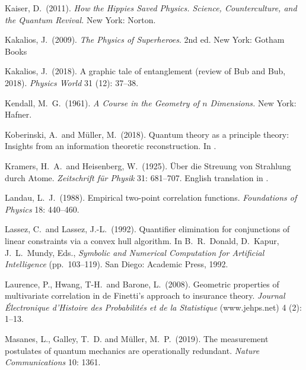 \documentclass[12pt]{article}
\numberwithin{equation}{section}
\begin{document}
\begin{thebibliography}{}
 Kaiser, D.\ (2011). \emph{How the Hippies Saved Physics. Science, Counterculture, and the Quantum Revival.} New York: Norton.

 Kakalios, J.\ (2009). \emph{The Physics of Superheroes}. 2nd ed. New York: Gotham Books

 Kakalios, J.\ (2018). A graphic tale of entanglement (review of Bub and Bub, 2018). \emph{Physics World} 31 (12): 37--38. 

 Kendall, M.~G.\ (1961). \emph{A Course in the Geometry of $n$ Dimensions.} New York: Hafner. 

 Koberinski, A.\ and M\"uller, M.\ (2018). Quantum theory as a principle theory: Insights from an information theoretic reconstruction. In \citet[pp. 257--281]{Cuffaro and Fletcher 2018}. 

 Kramers, H.\ A.\ and Heisenberg, W.\ (1925). \"{U}ber die Streuung von Strahlung durch Atome. \emph{Zeitschrift f\"{u}r Physik} 31: 681--707. English translation in \citet[pp. 223--252]{Van der Waerden}.

 Landau, L.\ J.\ (1988). Empirical two-point correlation functions. \emph{Foundations of Physics} 18: 440--460.

 Lassez, C.\ and Lassez, J.-L.\ (1992). Quantifier elimination for conjunctions of linear constraints via a convex hull algorithm. In B.\ R.\ Donald, D.\ Kapur, J.\ L.\ Mundy, Eds., \emph{Symbolic and Numerical Computation for Artificial Intelligence} (pp.\ 103--119). San Diego: Academic Press, 1992.

 Laurence, P., Hwang, T-H.\ and Barone, L.\ (2008). Geometric properties of multivariate correlation in de Finetti's approach to insurance theory. \emph{Journal \'Electronique d'Histoire des Probabilit\'es et de la Statistique} (www.jehps.net) 4 (2): 1--13.


 Masanes, L., Galley, T.~D. and M\"uller, M.~P.\ (2019). The measurement postulates of quantum mechanics are operationally redundant. \emph{Nature Communications} 10: 1361.


\end{thebibliography}
\end{document}
